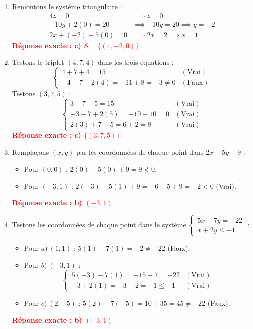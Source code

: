 \documentclass[12pt,a4paper]{article}
\begin{document}
\begin{enumerate}
  \item Remontons le système triangulaire :
  \begin{align*}
  4z = 0 &\implies z = 0 \\
  -10y + 2(0) = 20 &\implies -10y = 20 \implies y = -2 \\
  2x + (-2) - 5(0) = 0 &\implies 2x = 2 \implies x = 1
  \end{align*}
  \textcolor{red}{\textbf{Réponse exacte : c) $S = \{(1,-2,0)\}$}}

  \item Testons le triplet $(4,7,4)$ dans les trois équations :
  \[
  \begin{cases}
  4 + 7 + 4 = 15 & (\text{Vrai}) \\
  -4 - 7 + 2(4) = -11 + 8 = -3 \neq 0 & (\text{Faux})
  \end{cases}
  \]
  Testons $(3,7,5)$ :
  \[
  \begin{cases}
  3 + 7 + 5 = 15 & (\text{Vrai}) \\
  -3 - 7 + 2(5) = -10 + 10 = 0 & (\text{Vrai}) \\
  2(3) + 7 - 5 = 6 + 2 = 8 & (\text{Vrai})
  \end{cases}
  \]
  \textcolor{red}{\textbf{Réponse exacte : c) $\{(3,7,5)\}$}}

  \item Remplaçons $(x,y)$ par les coordonnées de chaque point dans $2x - 5y + 9$ :
  \begin{itemize}
      \item Pour $(0,0)$ : $2(0) - 5(0) + 9 = 9 \not< 0$.
      \item Pour $(-3,1)$ : $2(-3) - 5(1) + 9 = -6 - 5 + 9 = -2 < 0$ (Vrai).
  \end{itemize}
  \textcolor{red}{\textbf{Réponse exacte : b) $(-3,1)$}}

\item Testons les coordonnées de chaque point dans le système $\begin{cases} 5x - 7y = -22 \\ x + 2y \le -1 \end{cases}$ :
  \begin{itemize}
      \item Pour $a)~(1,1)$ : $5(1) - 7(1) = -2 \neq -22$ (Faux).
      \item Pour $b)~(-3,1)$ : 
      \[
      \begin{cases}
      5(-3) - 7(1) = -15 - 7 = -22 & (\text{Vrai}) \\
      -3 + 2(1) = -3 + 2 = -1 \le -1 & (\text{Vrai})
      \end{cases}
      \]
      \item Pour $c)~(2,-5)$ : $5(2) - 7(-5) = 10 + 35 = 45 \neq -22$ (Faux).
  \end{itemize}
  \textcolor{red}{\textbf{Réponse exacte : b) $(-3,1)$}}
\end{enumerate}
\end{document}
